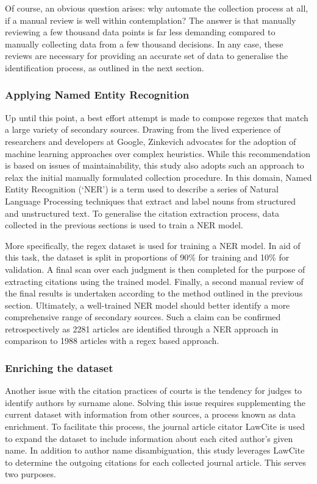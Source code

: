 Of course, an obvious question arises: why automate the collection process at all, if a manual review is well within contemplation? The answer is that manually reviewing a few thousand data points is far less demanding compared to manually collecting data from a few thousand decisions. In any case, these reviews are necessary for providing an accurate set of data to generalise the identification process, as outlined in the next section.

\subsubsection{Applying Named Entity Recognition}

Up until this point, a best effort attempt is made to compose regexes that match a large variety of secondary sources. Drawing from the lived experience of researchers and developers at Google, Zinkevich advocates for the adoption of machine learning approaches over complex heuristics. While this recommendation is based on issues of maintainability, this study also adopts such an approach to relax the initial manually formulated collection procedure. In this domain, Named Entity Recognition (`NER') is a term used to describe a series of Natural Language Processing techniques that extract and label nouns from structured and unstructured text. To generalise the citation extraction process, data collected in the previous sections is used to train a NER model.

More specifically, the regex dataset is used for training a NER model. In aid of this task, the dataset is split in proportions of 90\% for training and 10\% for validation. A final scan over each judgment is then completed for the purpose of extracting citations using the trained model. Finally, a second manual review of the final results is undertaken according to the method outlined in the previous section. Ultimately, a well-trained NER model should better identify a more comprehensive range of secondary sources. Such a claim can be confirmed retrospectively as 2281 articles are identified through a NER approach in comparison to 1988 articles with a regex based approach.

\subsubsection{Enriching the dataset}

Another issue with the citation practices of courts is the tendency for judges to identify authors by surname alone. Solving this issue requires supplementing the current dataset with information from other sources, a process known as data enrichment. To facilitate this process, the journal article citator LawCite is used to expand the dataset to include information about each cited author's given name. In addition to author name disambiguation, this study leverages LawCite to determine the outgoing citations for each collected journal article. This serves two purposes.

